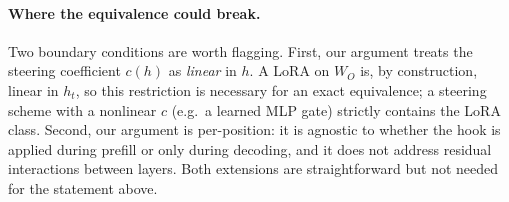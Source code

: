 \documentclass[11pt]{article}
\begin{document}
\paragraph{Where the equivalence could break.}
Two boundary conditions are worth flagging. First, our argument treats the steering coefficient $c(h)$ as \emph{linear} in $h$. A LoRA on $W_O$ is, by construction, linear in $h_t$, so this restriction is necessary for an exact equivalence; a steering scheme with a nonlinear $c$ (e.g.\ a learned MLP gate) strictly contains the LoRA class. Second, our argument is per-position: it is agnostic to whether the hook is applied during prefill or only during decoding, and it does not address residual interactions between layers. Both extensions are straightforward but not needed for the statement above.
\end{document}
